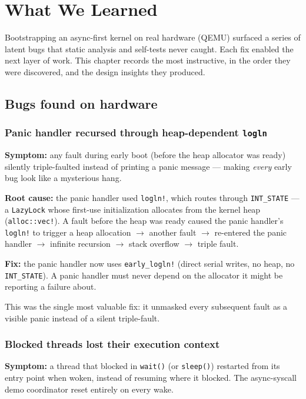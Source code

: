 \chapter{What We Learned}

Bootstrapping an async-first kernel on real hardware (QEMU) surfaced a series
of latent bugs that static analysis and self-tests never caught. Each fix
enabled the next layer of work. This chapter records the most instructive, in
the order they were discovered, and the design insights they produced.

\section{Bugs found on hardware}

\subsection{Panic handler recursed through heap-dependent \texttt{logln}}

\textbf{Symptom:} any fault during early boot (before the heap allocator was
ready) silently triple-faulted instead of printing a panic message --- making
\emph{every} early bug look like a mysterious hang.

\textbf{Root cause:} the panic handler used \texttt{logln!}, which routes
through \texttt{INT\_STATE} --- a \texttt{LazyLock} whose first-use
initialization allocates from the kernel heap (\texttt{alloc::vec!}). A fault
before the heap was ready caused the panic handler's \texttt{logln!} to trigger
a heap allocation $\rightarrow$ another fault $\rightarrow$ re-entered the
panic handler $\rightarrow$ infinite recursion $\rightarrow$ stack overflow
$\rightarrow$ triple fault.

\textbf{Fix:} the panic handler now uses \texttt{early\_logln!} (direct serial
writes, no heap, no \texttt{INT\_STATE}). A panic handler must never depend on
the allocator it might be reporting a failure about.

This was the single most valuable fix: it unmasked every subsequent fault as a
visible panic instead of a silent triple-fault.

\subsection{Blocked threads lost their execution context}

\textbf{Symptom:} a thread that blocked in \texttt{wait()} (or \texttt{sleep()})
restarted from its entry point when woken, instead of resuming where it
blocked. The async-syscall demo coordinator reset entirely on every wake.


